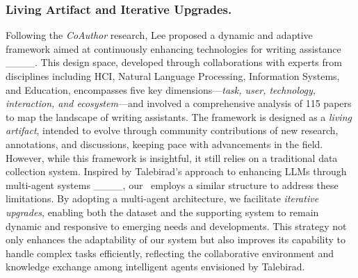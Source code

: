 \subsubsection{Living Artifact and Iterative Upgrades.}
Following the \textit{CoAuthor} research, Lee proposed a dynamic and adaptive framework aimed at continuously enhancing technologies for writing assistance ____. This design space, developed through collaborations with experts from disciplines including HCI, Natural Language Processing, Information Systems, and Education, encompasses five key dimensions—\textit{task, user, technology, interaction, and ecosystem}—and involved a comprehensive analysis of 115 papers to map the landscape of writing assistants. The framework is designed as a \textit{living artifact}, intended to evolve through community contributions of new research, annotations, and discussions, keeping pace with advancements in the field. However, while this framework is insightful, it still relies on a traditional data collection system. Inspired by Talebirad's approach to enhancing LLMs through multi-agent systems ____, our \dataset~employs a similar structure to address these limitations. By adopting a multi-agent architecture, we facilitate \textit{iterative upgrades}, enabling both the dataset and the supporting system to remain dynamic and responsive to emerging needs and developments. This strategy not only enhances the adaptability of our system but also improves its capability to handle complex tasks efficiently, reflecting the collaborative environment and knowledge exchange among intelligent agents envisioned by Talebirad.